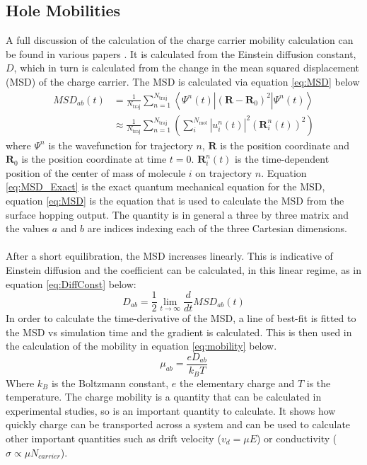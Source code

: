 \subsection{Hole Mobilities}
\label{sect:mobilities}
A full discussion of the calculation of the charge carrier mobility calculation can be found in various papers \cite{Carof2017FSSH,Giannini2018Crossover,Giannini2019}. It is calculated from the Einstein diffusion constant, $D$, which in turn is calculated from the change in the mean squared displacement (MSD) of the charge carrier. The MSD is calculated via equation \eqref{eq:MSD} below
\begin{align}
  \label{eq:MSD_Exact}
  MSD_{ab}(t) &= \frac{1}{N_{\text{traj}}} \sum_{n=1}^{N_{\text{traj}}} \left\langle \Psi^{n}(t) | (\mathbf{R} - \mathbf{R}_{0})^2 | \Psi^{n}(t) \right\rangle \\
	&\approx \frac{1}{N_{\text{traj}}} \sum_{n=1}^{N_{\text{traj}}} \left(\sum_{i}^{N_{\text{mol}}} \left| u^{n}_{i}(t) \right|^2 (\mathbf{R}_{i}^{n}(t))^2 \right)
  \label{eq:MSD}
\end{align}
where $\Psi^{n}$ is the wavefunction for trajectory $n$, $\mathbf{R}$ is the position coordinate and $\mathbf{R}_{0}$ is the position coordinate at time $t=0$. $\mathbf{R}_{i}^{n}(t)$ is the time-dependent position of the center of mass of molecule $i$ on trajectory $n$. Equation \eqref{eq:MSD_Exact} is the exact quantum mechanical equation for the MSD, equation \eqref{eq:MSD} is the equation that is used to calculate the MSD from the surface hopping output. The quantity is in general a three by three matrix and the values $a$ and $b$ are indices indexing each of the three Cartesian dimensions.
\\\\
After a short equilibration, the MSD increases linearly. This is indicative of Einstein diffusion and the coefficient can be calculated, in this linear regime, as in equation \eqref{eq:DiffConst} below:
\begin{equation}
  D_{ab} = \frac{1}{2} \lim_{t \rightarrow \infty} \frac{d}{dt}MSD_{ab}(t)
  \label{eq:DiffConst}
\end{equation}
In order to calculate the time-derivative of the MSD, a line of best-fit is fitted to the MSD vs simulation time and the gradient is calculated. This is then used in the calculation of the mobility in equation \eqref{eq:mobility} below.
\begin{equation}
	\mu_{ab} = \frac{e D_{ab}}{k_{B} T}
	\label{eq:mobility}
\end{equation}
Where $k_{B}$ is the Boltzmann constant, $e$ the elementary charge and $T$ is the temperature. The charge mobility is a quantity that can be calculated in experimental studies, so is an important quantity to calculate. It shows how quickly charge can be transported across a system and can be used to calculate other important quantities such as drift velocity ($v_{d} = \mu E$) or conductivity ($\sigma \propto \mu N_{carrier}$).
